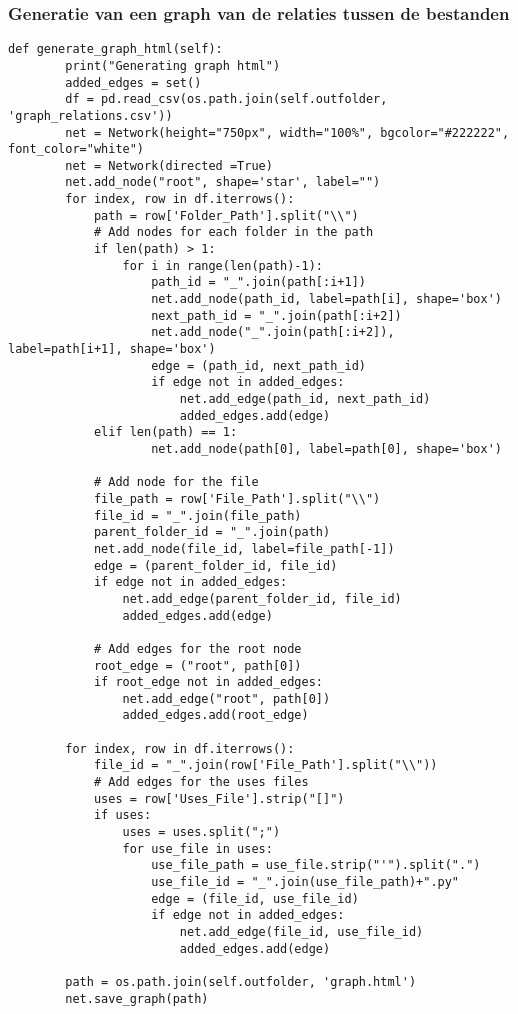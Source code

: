 \subsubsection{Generatie van een graph van de relaties tussen de bestanden}
\label{bijlage:generate-file-graph}

\begin{verbatim}
def generate_graph_html(self):
        print("Generating graph html")
        added_edges = set()
        df = pd.read_csv(os.path.join(self.outfolder, 'graph_relations.csv'))
        net = Network(height="750px", width="100%", bgcolor="#222222", font_color="white") 
        net = Network(directed =True)
        net.add_node("root", shape='star', label="")     
        for index, row in df.iterrows():
            path = row['Folder_Path'].split("\\")
            # Add nodes for each folder in the path
            if len(path) > 1:
                for i in range(len(path)-1):
                    path_id = "_".join(path[:i+1])
                    net.add_node(path_id, label=path[i], shape='box')
                    next_path_id = "_".join(path[:i+2])
                    net.add_node("_".join(path[:i+2]), label=path[i+1], shape='box')                        
                    edge = (path_id, next_path_id)
                    if edge not in added_edges:
                        net.add_edge(path_id, next_path_id)
                        added_edges.add(edge)
            elif len(path) == 1:
                    net.add_node(path[0], label=path[0], shape='box')

            # Add node for the file
            file_path = row['File_Path'].split("\\")
            file_id = "_".join(file_path)
            parent_folder_id = "_".join(path)
            net.add_node(file_id, label=file_path[-1])
            edge = (parent_folder_id, file_id)
            if edge not in added_edges:
                net.add_edge(parent_folder_id, file_id)
                added_edges.add(edge)

            # Add edges for the root node
            root_edge = ("root", path[0])
            if root_edge not in added_edges:
                net.add_edge("root", path[0])
                added_edges.add(root_edge)
        
        for index, row in df.iterrows():
            file_id = "_".join(row['File_Path'].split("\\"))
            # Add edges for the uses files
            uses = row['Uses_File'].strip("[]")
            if uses:
                uses = uses.split(";")
                for use_file in uses:
                    use_file_path = use_file.strip("'").split(".")
                    use_file_id = "_".join(use_file_path)+".py"
                    edge = (file_id, use_file_id)
                    if edge not in added_edges:
                        net.add_edge(file_id, use_file_id)
                        added_edges.add(edge)

        path = os.path.join(self.outfolder, 'graph.html')
        net.save_graph(path)
\end{verbatim}
